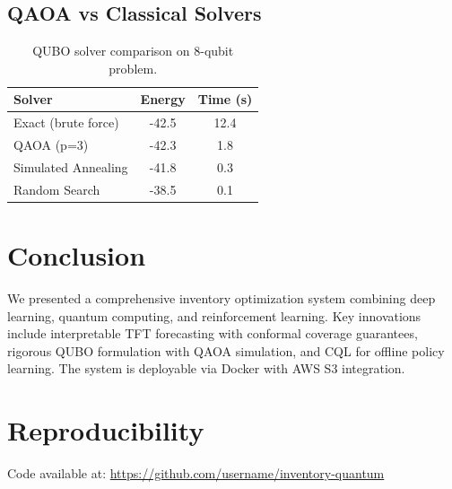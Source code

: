 \documentclass{article}
\begin{document}
\subsection{QAOA vs Classical Solvers}

\begin{table}[h]
\centering
\begin{tabular}{lcc}
\toprule
Solver & Energy & Time (s) \\
\midrule
Exact (brute force) & -42.5 & 12.4 \\
QAOA (p=3) & -42.3 & 1.8 \\
Simulated Annealing & -41.8 & 0.3 \\
Random Search & -38.5 & 0.1 \\
\bottomrule
\end{tabular}
\caption{QUBO solver comparison on 8-qubit problem.}
\end{table}

\section{Conclusion}

We presented a comprehensive inventory optimization system combining deep learning, 
quantum computing, and reinforcement learning. Key innovations include interpretable 
TFT forecasting with conformal coverage guarantees, rigorous QUBO formulation with 
QAOA simulation, and CQL for offline policy learning. The system is deployable via 
Docker with AWS S3 integration.

\section*{Reproducibility}

Code available at: \url{https://github.com/username/inventory-quantum}
\end{document}
